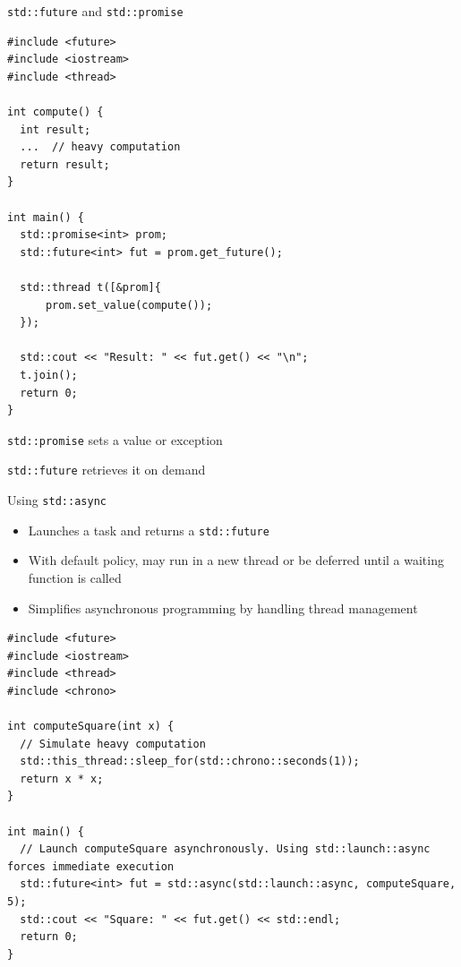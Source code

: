 \documentclass{beamer}
\begin{document}
\begin{frame}[fragile]{\texttt{std::future} and \texttt{std::promise}}
  \lstset{style=CStyle}
  \begin{lstlisting}
#include <future>
#include <iostream>
#include <thread>

int compute() {
  int result;
  ...  // heavy computation
  return result;
}

int main() {
  std::promise<int> prom;
  std::future<int> fut = prom.get_future();

  std::thread t([&prom]{
      prom.set_value(compute());
  });

  std::cout << "Result: " << fut.get() << "\n";
  t.join();
  return 0;
}
  \end{lstlisting}

  \texttt{std::promise} sets a value or exception

  \texttt{std::future} retrieves it on demand
\end{frame}

\begin{frame}[fragile]{Using \texttt{std::async}}
  \begin{itemize}
    \item Launches a task and returns a \texttt{std::future}
    \item With default policy, may run in a new thread or be deferred until a waiting function is called
    \item Simplifies asynchronous programming by handling thread management
  \end{itemize}
  \lstset{style=CStyle}
  \begin{lstlisting}
#include <future>
#include <iostream>
#include <thread>
#include <chrono>

int computeSquare(int x) {
  // Simulate heavy computation
  std::this_thread::sleep_for(std::chrono::seconds(1));
  return x * x;
}

int main() {
  // Launch computeSquare asynchronously. Using std::launch::async forces immediate execution
  std::future<int> fut = std::async(std::launch::async, computeSquare, 5);
  std::cout << "Square: " << fut.get() << std::endl;
  return 0;
}
  \end{lstlisting}
\end{frame}
\end{document}
